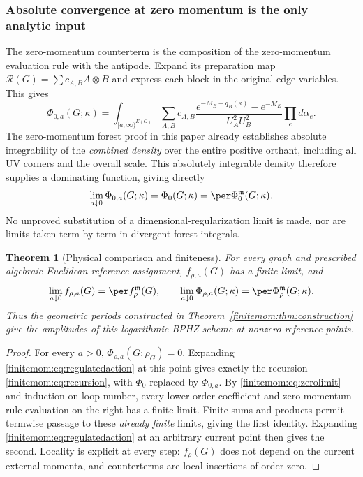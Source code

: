 \documentclass[11pt,a4paper,oneside]{article}
\theoremstyle{plain}
\newtheorem{theorem}{Theorem}[section]
\theoremstyle{definition}
\theoremstyle{remark}
\numberwithin{equation}{section}
\begin{document}
\subsubsection{Absolute convergence at zero momentum is the only analytic input}
The zero-momentum counterterm is the composition of the zero-momentum evaluation rule with the antipode.
Expand its preparation map $\mathcal R(G)=\sum c_{A,B}A\otimes B$ and express each block in the original edge variables. This gives
\begin{equation}\label{finitemom:eq:zerodensity}
 \Phi_{0,a}(G;\kappa)=
 \int_{[a,\infty)^{E(G)}}
 \sum_{A,B}c_{A,B}
 \frac{e^{-M_E-q_B(\kappa)}-e^{-M_E}}{U_A^2U_B^2}
                                  \prod_e d\alpha_e.
\end{equation}
The zero-momentum forest proof in this paper already establishes absolute integrability of the \emph{combined density} over the entire positive orthant, including all UV corners and the overall scale.
This absolutely integrable density therefore supplies a dominating function, giving directly
\begin{equation}\label{finitemom:eq:zerolimit}
 \lim_{a\downarrow0}\Phi_{0,a}(G;\kappa)
              =\Phi_0(G;\kappa)=\per\Phi_0^{\mathfrak m}(G;\kappa).
\end{equation}
No unproved substitution of a dimensional-regularization limit is made, nor are limits taken term by term in divergent forest integrals.

\begin{theorem}[Physical comparison and finiteness]\label{finitemom:thm:physical}
For every graph and prescribed algebraic Euclidean reference assignment, $f_{\rho,a}(G)$ has a finite limit, and
\begin{equation}\label{finitemom:eq:physical}
 \lim_{a\downarrow0} f_{\rho,a}(G)=\per f_\rho^{\mathfrak m}(G),
 \qquad
 \lim_{a\downarrow0}\Phi_{\rho,a}(G;\kappa)
                         =\per\Phi_\rho^{\mathfrak m}(G;\kappa).
\end{equation}
Thus the geometric periods constructed in Theorem~\ref{finitemom:thm:construction} give the amplitudes of this logarithmic BPHZ scheme at nonzero reference points.
\end{theorem}
\begin{proof}
For every $a>0$, $\Phi_{\rho,a}(G;\rho_G)=0$.
Expanding \eqref{finitemom:eq:regulatedaction} at this point gives exactly the recursion \eqref{finitemom:eq:recursion}, with $\Phi_0$ replaced by $\Phi_{0,a}$.
By \eqref{finitemom:eq:zerolimit} and induction on loop number, every lower-order coefficient and zero-momentum-rule evaluation on the right has a finite limit.
Finite sums and products permit termwise passage to these \emph{already finite} limits, giving the first identity.
Expanding \eqref{finitemom:eq:regulatedaction} at an arbitrary current point then gives the second.
Locality is explicit at every step: $f_\rho(G)$ does not depend on the current external momenta, and counterterms are local insertions of order zero.
\end{proof}
\end{document}
